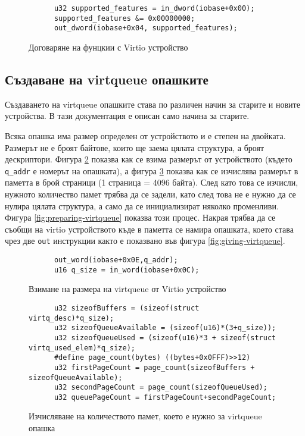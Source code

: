   \begin{figure}[htpb]
    \centering
    \begin{verbatim}
      u32 supported_features = in_dword(iobase+0x00);
      supported_features &= 0x00000000;
      out_dword(iobase+0x04, supported_features);
    \end{verbatim}
    \caption{Договаряне на фунцкии с Virtio устройство}
    \label{fig:disabling-all-features}
  \end{figure}

  \subsection{Създаване на virtqueue опашките}
  Създаването на virtqueue опашките става по различен начин за старите и новите устройства. В тази документация е описан само начина за старите.

  Всяка опашка има размер определен от устройството и е степен на двойката. Размерът не е броят байтове, които ще заема цялата структура, а броят дескриптори. Фигура \ref{fig:getting-virtqueue-size} показва как се взима размерът от устройството (където {\tt q\_addr} е номерът на опашката), а фигура \ref{fig:calculating-virtqueue-size} показва как се изчислява размерът в паметта в брой страници (1 страница = 4096 байта). След като това се изчисли, нужното количество памет трябва да се задели, като след това не е нужно да се нулира цялата структура, а само да се инициализират няколко променливи. Фигура \ref{fig:preparing-virtqueue} показва този процес. Накрая трябва да се съобщи на virtio устройството къде в паметта се намира опашката, което става чрез две {\tt out} инструкции както е показвано във фигура \ref{fig:giving-virtqueue}.

  \begin{figure}[htpb]
    \centering
    \begin{verbatim}
      out_word(iobase+0x0E,q_addr);
      u16 q_size = in_word(iobase+0x0C);
    \end{verbatim}
    \caption{Взимане на размера на virtqueue от Virtio устройство}
    \label{fig:getting-virtqueue-size}
  \end{figure}

  \begin{figure}[htpb]
    \centering
    \begin{verbatim}
      u32 sizeofBuffers = (sizeof(struct virtq_desc)*q_size);
      u32 sizeofQueueAvailable = (sizeof(u16)*(3+q_size));
      u32 sizeofQueueUsed = (sizeof(u16)*3 + sizeof(struct virtq_used_elem)*q_size);
      #define page_count(bytes) ((bytes+0x0FFF)>>12)
      u32 firstPageCount = page_count(sizeofBuffers + sizeofQueueAvailable);
      u32 secondPageCount = page_count(sizeofQueueUsed);
      u32 queuePageCount = firstPageCount+secondPageCount;
    \end{verbatim}
    \caption{Изчисляване на количеството памет, което е нужно за virtqueue опашка}
    \label{fig:calculating-virtqueue-size}
  \end{figure}

